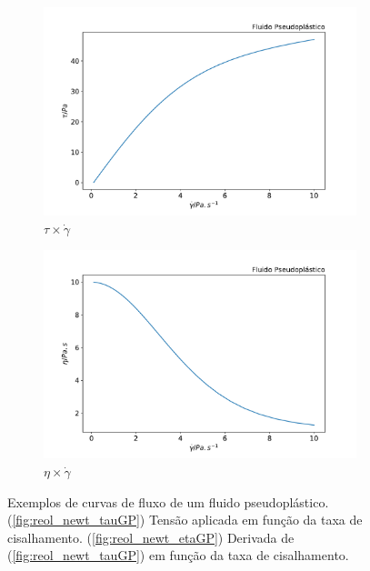 			\begin{figure}[H]
				\begin{subfigure}[t]{.5\textwidth}
					\includegraphics[width=\textwidth]{./imagens/reologia/pseudoplastico_tau}
					\caption{\(\tau \times \dot{\gamma}\)}
					\label{fig:reol_pseudo_tauGP}
				\end{subfigure}%
				\begin{subfigure}[t]{.5\textwidth}
					\includegraphics[width=\textwidth]{./imagens/reologia/pseudoplastico_eta}
					\caption{\(\eta \times \dot{\gamma}\)}
					\label{fig:reol_pseudo_etaGP}
				\end{subfigure}
				\caption{Exemplos de curvas de fluxo de um fluido pseudoplástico. (\ref{fig:reol_newt_tauGP}) Tensão aplicada em função da taxa de cisalhamento. (\ref{fig:reol_newt_etaGP}) Derivada de (\ref{fig:reol_newt_tauGP}) em função da taxa de cisalhamento.}
				\label{fig:reol_pseudoplastico_exemplos}
			\end{figure}
			
